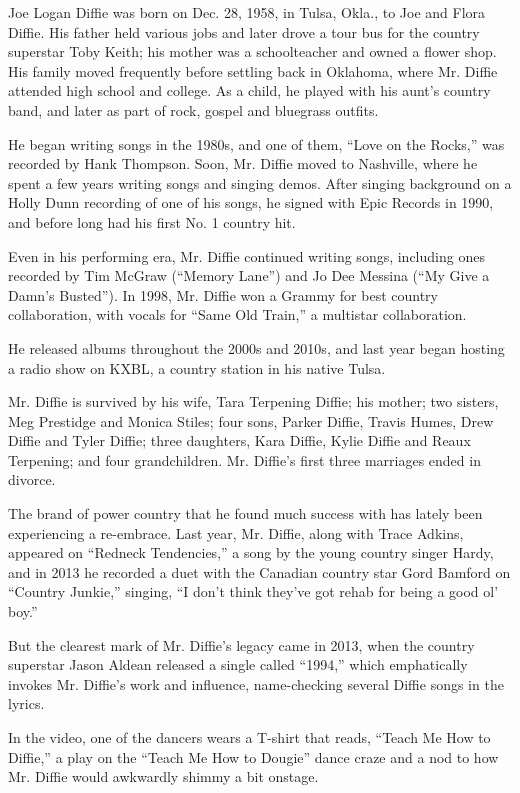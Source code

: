 Joe Logan Diffie was born on Dec. 28, 1958, in Tulsa, Okla., to Joe and
Flora Diffie. His father held various jobs and later drove a tour bus
for the country superstar Toby Keith; his mother was a schoolteacher and
owned a flower shop. His family moved frequently before settling back in
Oklahoma, where Mr. Diffie attended high school and college. As a child,
he played with his aunt's country band, and later as part of rock,
gospel and bluegrass outfits.

He began writing songs in the 1980s, and one of them, ``Love on the
Rocks,'' was recorded by Hank Thompson. Soon, Mr. Diffie moved to
Nashville, where he spent a few years writing songs and singing demos.
After singing background on a Holly Dunn recording of one of his songs,
he signed with Epic Records in 1990, and before long had his first No. 1
country hit.

Even in his performing era, Mr. Diffie continued writing songs,
including ones recorded by Tim McGraw (``Memory Lane'') and Jo Dee
Messina (``My Give a Damn's Busted''). In 1998, Mr. Diffie won a Grammy
for best country collaboration, with vocals for ``Same Old Train,'' a
multistar collaboration.

He released albums throughout the 2000s and 2010s, and last year began
hosting a radio show on KXBL, a country station in his native Tulsa.

Mr. Diffie is survived by his wife, Tara Terpening Diffie; his mother;
two sisters, Meg Prestidge and Monica Stiles; four sons, Parker Diffie,
Travis Humes, Drew Diffie and Tyler Diffie; three daughters, Kara
Diffie, Kylie Diffie and Reaux Terpening; and four grandchildren. Mr.
Diffie's first three marriages ended in divorce.

The brand of power country that he found much success with has lately
been experiencing a re-embrace. Last year, Mr. Diffie, along with Trace
Adkins, appeared on ``Redneck Tendencies,'' a song by the young country
singer Hardy, and in 2013 he recorded a duet with the Canadian country
star Gord Bamford on ``Country Junkie,'' singing, ``I don't think
they've got rehab for being a good ol' boy.''

But the clearest mark of Mr. Diffie's legacy came in 2013, when the
country superstar Jason Aldean released a single called ``1994,'' which
emphatically invokes Mr. Diffie's work and influence, name-checking
several Diffie songs in the lyrics.

In the video, one of the dancers wears a T-shirt that reads, ``Teach Me
How to Diffie,'' a play on the ``Teach Me How to Dougie'' dance craze
and a nod to how Mr. Diffie would awkwardly shimmy a bit onstage.

